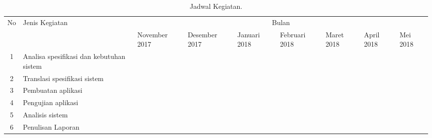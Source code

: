 \begin{table}[H]
	\caption{Jadwal Kegiatan.}
	
	\begin{center}
		\resizebox{\textwidth}{!}
		{\begin{tabular}{|c|p{5cm}|p{2cm}|p{2cm}|p{2cm}|p{2cm}|p{2cm}|p{2cm}|p{2cm}|}
				\hline 
				\multirow{2}{*}{No} & \multirow{2}{*}{Jenis Kegiatan} & \multicolumn{7}{c|}{Bulan}
				\tabularnewline
				
				\cline{3-9} 
				&  & November 2017 & Desember 2017 & Januari 2018 & Februari 2018 & Maret 2018 & April 2018 & Mei 2018
				\tabularnewline
				
				\hline 
				1 & Analisa spesifikasi dan kebutuhan sistem & \cellcolor{cyan} & \cellcolor{cyan} &  &  &  &  & \tabularnewline
				
				\hline 
				2 & Translasi spesifikasi sistem &  & \cellcolor{red} &  &  &  &  & \tabularnewline
				
				\hline 
				3 & Pembuatan aplikasi &&  
				\cellcolor{green} & \cellcolor{green} & \cellcolor{green} & \cellcolor{green} &  & \tabularnewline
				
				\hline 
				4 & Pengujian aplikasi &  &  &  &  & \cellcolor{darkgray} & \cellcolor{darkgray} & \tabularnewline
				
				\hline 
				5 & Analisis sistem &  &  &  &  &  & \cellcolor{lightgray} & \cellcolor{lightgray} \tabularnewline
				
				\hline 
				6 & Penulisan Laporan & \cellcolor{yellow} & \cellcolor{yellow} & \cellcolor{yellow} & \cellcolor{yellow} & \cellcolor{yellow} & \cellcolor{yellow} & \cellcolor{yellow} 
				\tabularnewline
				
				\hline 
		\end{tabular}}
		\par\end{center}
\end{table}